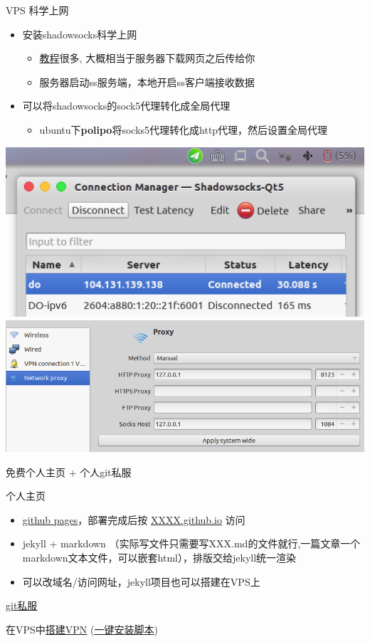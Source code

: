 \documentclass[color=usenames,dvipsnames]{beamer}
\begin{document}
\begin{frame}{VPS 科学上网}
 \begin{itemize}
  \item 安装shadowsocks科学上网
    \begin{itemize}
     \item \href{http://zipperary.com/2015/01/17/ss-built/}{教程}很多, 大概相当于服务器下载网页之后传给你
     \item 服务器启动ss服务端，本地开启ss客户端接收数据
    \end{itemize}
  \item 可以将shadowsocks的sock5代理转化成全局代理
    \begin{itemize}
     \item ubuntu下\textbf{polipo}将socks5代理转化成http代理，然后设置全局代理
    \end{itemize}
 \end{itemize}

     \centering\includegraphics[width=0.4\hsize]{pic/ss客户端.png}
    \centering\includegraphics[width=0.45\hsize]{pic/全局代理.png}
\end{frame}


\begin{frame}{免费个人主页 + 个人git私服}
 \begin{block}{}
  个人主页
 \end{block}

 
 \begin{itemize}
  \item \href{https://pages.github.com/}{github pages}，部署完成后按 \href{iampkuhz.github.io}{XXXX.github.io} 访问
  \item jekyll + markdown （实际写文件只需要写XXX.md的文件就行,一篇文章一个markdown文本文件，可以嵌套html），排版交给jekyll统一渲染
  \item 可以改域名/访问网址，jekyll项目也可以搭建在VPS上
 \end{itemize}
 
 \begin{block}{}
  \href{http://www.liaoxuefeng.com/wiki/0013739516305929606dd18361248578c67b8067c8c017b000/00137583770360579bc4b458f044ce7afed3df579123eca000}{git私服}
 \end{block}
 \begin{block}{}
  在VPS中\href{https://www.digitalocean.com/community/tutorials/how-to-setup-your-own-vpn-with-pptp}{搭建VPN} (\href{http://yansu.org/2013/12/11/deploy-pptp-vpn-in-ubuntu.html}{一键安装脚本})
 \end{block}
\end{frame}
\end{document}
